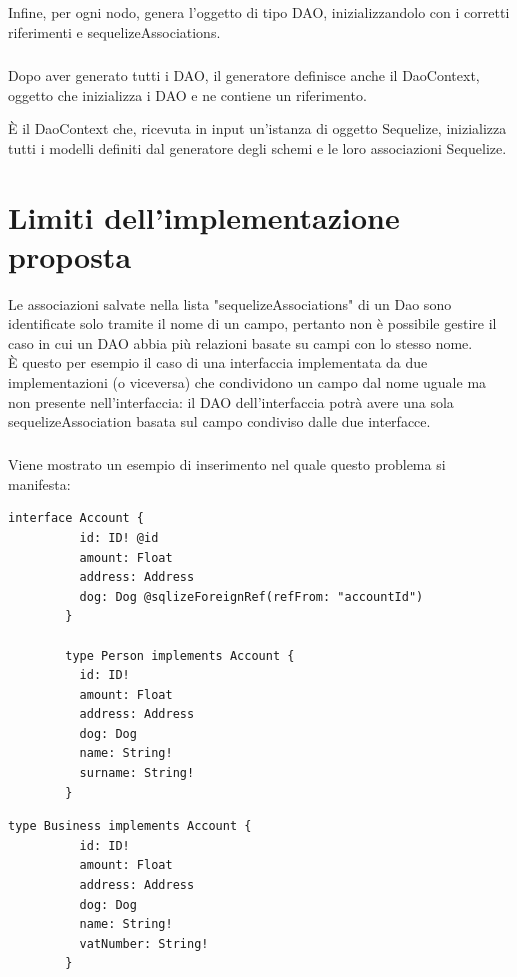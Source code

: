 \documentclass[a4paper, 12pt]{report}
\begin{document}
      \paragraph*{}
      Infine, per ogni nodo, genera l'oggetto di tipo DAO, inizializzandolo con i corretti riferimenti e sequelizeAssociations.
      \paragraph*{}
      Dopo aver generato tutti i DAO, il generatore definisce anche il DaoContext, oggetto che inizializza i DAO e ne contiene un riferimento.
      
      È il DaoContext che, ricevuta in input un'istanza di oggetto Sequelize, inizializza tutti i modelli definiti dal generatore degli schemi e le loro associazioni Sequelize. 

    \newpage
    \chapter{Limiti dell'implementazione proposta}
      Le associazioni salvate nella lista "sequelizeAssociations" di un Dao sono identificate solo tramite il nome di un campo, pertanto non è possibile gestire il caso in cui un DAO abbia più relazioni basate su campi con lo stesso nome.\\
      È questo per esempio il caso di una interfaccia implementata da due implementazioni (o viceversa) che condividono un campo dal nome uguale ma non presente nell'interfaccia: il DAO dell'interfaccia potrà avere una sola sequelizeAssociation basata sul campo condiviso dalle due interfacce.\\
      \paragraph*{}
      Viene mostrato un esempio di inserimento nel quale questo problema si manifesta:
      \begin{Verbatim}[samepage=true]
        interface Account {
          id: ID! @id
          amount: Float
          address: Address
          dog: Dog @sqlizeForeignRef(refFrom: "accountId")
        }

        type Person implements Account {
          id: ID!
          amount: Float
          address: Address
          dog: Dog
          name: String!
          surname: String!
        }
      \end{Verbatim}
      \begin{Verbatim}[samepage=true]
        type Business implements Account {
          id: ID!
          amount: Float
          address: Address
          dog: Dog
          name: String!
          vatNumber: String!
        }
      \end{Verbatim}
\end{document}
